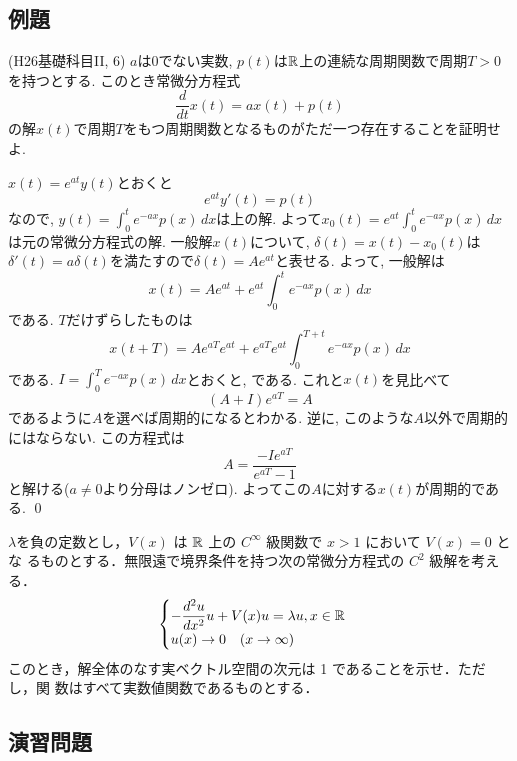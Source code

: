 \subsection{例題}
\begin{egprob} (H26基礎科目II, 6)
$a$は0でない実数, $p(t)$は$\mathbb{R}$上の連続な周期関数で周期$T>0$を持つとする. このとき常微分方程式
\[\dfrac{d}{dt}x(t) = ax(t) + p(t)\]
の解$x(t)$で周期$T$をもつ周期関数となるものがただ一つ存在することを証明せよ.
\end{egprob}
\begin{egans}
$x(t) = e^{at}y(t)$とおくと
\[e^{at}y'(t) = p(t)\]
なので, $y(t) = \int_{0}^{t}e^{-ax}p(x)\, dx$は上の解. よって$x_0(t) = e^{at}\int_{0}^{t} e^{-ax}p(x)\, dx$は元の常微分方程式の解. 一般解$x(t)$について, $\delta(t) = x(t)-x_0(t)$は$\delta'(t) = a\delta(t)$を満たすので$\delta(t) = Ae^{at}$と表せる. よって, 一般解は
\[x(t) = Ae^{at} + e^{at} \int_{0}^{t} e^{-ax}p(x)\, dx\]
である. $T$だけずらしたものは
\[x(t+T) = Ae^{aT}e^{at} + e^{aT}e^{at}\int_{0}^{T+t} e^{-ax} p(x)\, dx\]
である. $I = \int_{0}^{T} e^{-ax}p(x)\, dx$とおくと,
である. これと$x(t)$を見比べて
\[(A+I)e^{aT} = A\]
であるように$A$を選べば周期的になるとわかる. 逆に, このような$A$以外で周期的にはならない. この方程式は
\[A = \dfrac{-Ie^{aT}}{e^{aT} - 1}\]
と解ける($a\neq 0$より分母はノンゼロ). よってこの$A$に対する$x(t)$が周期的である. \qed
\end{egans}


\begin{egprob}
$\lambda$を負の定数とし，$V (x)$ は $\mathbb{R}$ 上の $C
^{\infty}$ 級関数で $x > 1$ において $V (x) = 0$ とな
るものとする．無限遠で境界条件を持つ次の常微分方程式の $C^2$ 級解を考える．
\[
\begin{cases}
-\dfrac{d^2 u}{dx^2} u + V(x) u = \lambda u,  x\in \mathbb{R} \\
u(x) \to 0\quad (x\to \infty)
\end{cases}
\]
このとき，解全体のなす実ベクトル空間の次元は 1 であることを示せ．ただし，関
数はすべて実数値関数であるものとする．
\end{egprob}






\clearpage
\subsection{演習問題}
